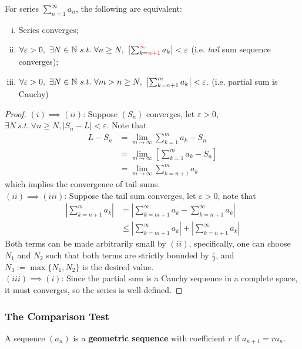\documentclass[11pt]{article}
\begin{document}
	\begin{theorem}
		For series $\sum_{n=1}^\infty a_n$, the following are equivalent:
		\begin{enumerate}[(i)]
			\item Series converges;
			\item $\forall \varepsilon > 0,\ \exists N \in \mathbb{N}\ s.t.\ \forall n \geq N,\ \left |\sum_{k=\textcolor{red}{n+1}}^{\textcolor{red}{\infty}} a_k \right | < \varepsilon$ (i.e. \emph{tail} sum sequence converges);
			\item $\forall \varepsilon > 0,\ \exists N \in \mathbb{N}\ s.t.\ \forall m > n \geq N,\ \left | \sum_{k=n+1}^m a_k \right | < \varepsilon$. (i.e. partial sum is Cauchy)
		\end{enumerate}
	\end{theorem}
	\begin{proof}
		$(i) \implies (ii)$: Suppose $(S_n)$ converges, let $\varepsilon > 0$, $\exists N\ s.t.\ \forall n \geq N, |S_n - L| < \varepsilon$. Note that 
		\begin{align}
			L - S_n &= \lim_{m \to \infty} \sum_{k=1}^m a_k  - S_n \\
			&= \lim_{m \to \infty} \left [ \sum_{k=1}^m a_k  - S_n \right ]\\
			&= \lim_{m \to \infty} \sum_{k=n+1}^m a_k
		\end{align}
		which implies the convergence of tail sums. \\
		$(ii) \implies (iii)$: Suppose the tail sum converges, let $\varepsilon > 0$, note that
		\begin{align}
			\left | 
			\sum_{k=n+1}^{m} a_k
			\right| &= \left |
			\sum_{k=m+1}^\infty a_k - \sum_{k=n+1}^\infty a_k
			\right| \\
			&\leq \left |
			\sum_{k=m+1}^\infty a_k \right | + \left | \sum_{k=n+1}^\infty a_k
			\right|
		\end{align}
		Both terms can be made arbitrarily small by $(ii)$, specifically, one can choose $N_1$ and $N_2$ such that both terms are strictly bounded by $\frac{\varepsilon}{2}$, and $N_3 := \max\{N_1, N_2\}$ is the desired value. \\
		$(iii) \implies (i)$: Since the partial sum is a Cauchy sequence in a complete space, it must converges, so the series is well-defined.
	\end{proof}
	
	\subsubsection{The Comparison Test}
	\begin{definition}
		A sequence $(a_n)$ is a \textbf{geometric sequence} with coefficient $r$ if $a_{n+1} = r a_n$.
	\end{definition}
	
\end{document}
